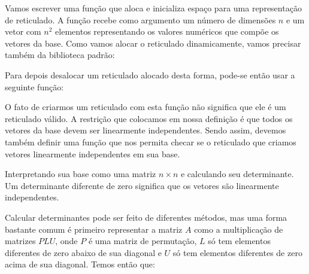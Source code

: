 Vamos escrever uma função que aloca e inicializa espaço para uma
representação de reticulado. A função recebe como argumento um número
de dimensões $n$ e um vetor com $n^2$ elementos representando os
valores numéricos que compõe os vetores da base. Como vamos alocar o
reticulado dinamicamente, vamos precisar também da biblioteca padrão:


Para depois desalocar um reticulado alocado desta forma, pode-se então
usar a seguinte função:


O fato de criarmos um reticulado com esta função não significa que ele
é um reticulado válido. A restrição que colocamos em nossa definição é
que todos os vetores da base devem ser linearmente
independentes. Sendo assim, devemos também definir uma função que nos
permita checar se o reticulado que criamos vetores linearmente
independentes em sua base.


 Interpretando sua base como uma matriz $n\times n$
e calculando seu determinante. Um determinante diferente de zero
significa que os vetores são linearmente independentes.

Calcular determinantes pode ser feito de diferentes métodos, mas uma
forma bastante comum é primeiro representar a matriz $A$ como a
multiplicação de matrizes $PLU$, onde $P$ é uma matriz de permutação,
$L$ só tem elementos diferentes de zero abaixo de sua diagonal e $U$
só tem elementos diferentes de zero acima de sua diagonal. Temos então
que:

